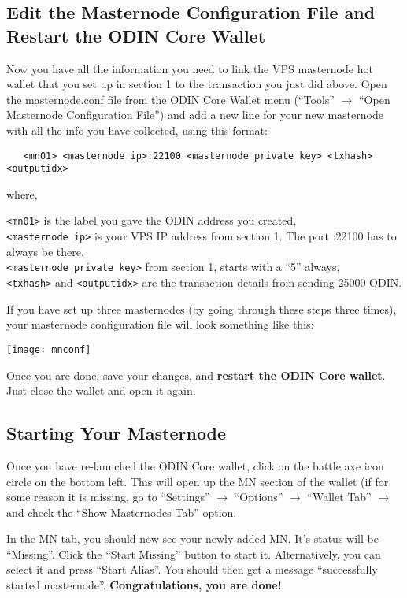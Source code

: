 \documentclass[rmp,12pt,notitlepage]{revtex4-1}
\begin{document}
\subsection{Edit the Masternode Configuration File and Restart the ODIN Core Wallet}
Now you have all the information you need to link the VPS masternode hot wallet that you set up in section 1 to the transaction you just did above. Open the masternode.conf file from the ODIN Core Wallet menu (``Tools'' $\rightarrow$ ``Open Masternode Configuration File'') and add a new line for your new masternode with all the info you have collected, using this format:
\begin{verbatim}
   <mn01> <masternode ip>:22100 <masternode private key> <txhash> <outputidx>
\end{verbatim}
where,

\verb|<mn01>| is the label you gave the ODIN address you created,  \\
\verb|<masternode ip>| is your VPS IP address from section 1. The port :22100 has to always be there, \\
\verb|<masternode private key>| from section 1, starts with a ``5'' always,\\
\verb|<txhash>| and \verb|<outputidx>| are the transaction details from sending \num{25000} ODIN.

If you have set up three masternodes (by going through these steps three times), your masternode configuration file will look something like this:
\begin{center}
   \texttt{[image: mnconf]}
\end{center}
Once you are done, save your changes, and \textbf{restart the ODIN Core wallet}. Just close the wallet and open it again.

\subsection{Starting Your Masternode}
Once you have re-launched the ODIN Core wallet, click on the battle axe icon circle on the bottom left.  This will open up the MN section of the wallet (if for some reason it is missing, go to ``Settings'' $\rightarrow$ ``Options'' $\rightarrow$ ``Wallet Tab'' $\rightarrow$ and check the ``Show Masternodes Tab'' option.  

In the MN tab, you should now see your newly added MN.  It's status will be ``Missing''.  Click the ``Start Missing'' button to start it.  Alternatively, you can select it and press ``Start Alias''.  You should then get a message ``successfully started masternode''.  \textbf{Congratulations, you are done!}  
\end{document}
